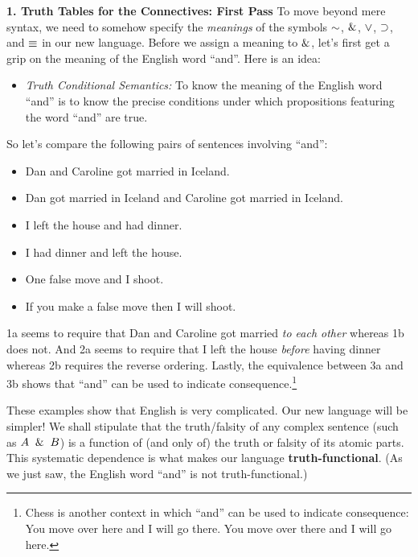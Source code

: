 \documentclass[options]{philosophersimprint}
\theoremstyle{definition}
\begin{document}
\textbf{1. Truth Tables for the Connectives: First Pass} To move beyond mere syntax, we need to somehow specify the \textit{meanings} of the symbols $\mathord{\sim}$, $\mathbin{\&}$, $\mathbin{\vee}$, $\mathbin{\supset}$, and $\mathbin{\equiv}$ in our new language. Before we assign a meaning to $\mathbin{\&}$, let's first get a grip on the meaning of the English word ``and''. Here is an idea:
\begin{itemize}
    \item \textit{Truth Conditional Semantics:} To know the meaning of the English word ``and'' is to know the precise conditions under which propositions featuring the word ``and'' are true.
\end{itemize}
So let's compare the following pairs of sentences involving ``and'':
\begin{itemize}
    \item[1a.] Dan and Caroline got married in Iceland.
    \item[1b.] Dan got married in Iceland and Caroline got married in Iceland.
    \item[2a.] I left the house and had dinner.
    \item[2b.] I had dinner and left the house.
    \item[3a.] One false move and I shoot.
    \item[3b.] If you make a false move then I will shoot.
\end{itemize}
1a seems to require that Dan and Caroline got married \textit{to each other} whereas 1b does not. And 2a seems to require that I left the house \textit{before} having dinner whereas 2b requires the reverse ordering. Lastly, the equivalence between 3a and 3b shows that ``and'' can be used to indicate consequence.\footnote{Chess is another context in which ``and'' can be used to indicate consequence: You move over here and I will go there. You move over there and I will go here.}

These examples show that English is very complicated. Our new language will be simpler! We shall stipulate that the truth/falsity of any complex sentence (such as $A \ \mathbin{\&} \  B$) is a function of (and only of) the truth or falsity of its atomic parts. This systematic dependence is what makes our language \textbf{truth-functional}. (As we just saw, the English word ``and'' is not truth-functional.)
\end{document}
